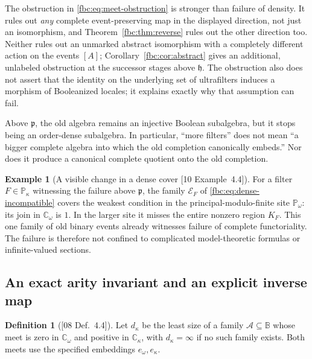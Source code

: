 \documentclass[11pt,letterpaper]{article}
\theoremstyle{definition}
\newtheorem{definition}[theorem]{Definition}
\newtheorem{example}[theorem]{Example}
\theoremstyle{remark}
\newcommand{\om}{\omega}
\newcommand{\B}{\mathbb B}
\newcommand{\C}{\mathbb C}
\newcommand{\PP}{\mathbb P}
\newcommand{\cp}{\mathfrak p}
\newcommand{\ch}{\mathfrak h}
\newcommand{\cE}{\mathcal E}
\newcommand{\src}[1]{\textup{[#1]}}
\begin{document}
The obstruction in \eqref{fbc:eq:meet-obstruction} is stronger than
failure of density. It rules out \emph{any} complete event-preserving
map in the displayed direction, not just an isomorphism, and
Theorem~\ref{fbc:thm:reverse} rules out the other direction too. Neither
rules out an unmarked abstract isomorphism with a completely different
action on the events $[A]$; Corollary~\ref{fbc:cor:abstract} gives an
additional, unlabeled obstruction at the successor stages above $\ch$.
The obstruction also does not assert that the identity on the underlying
set of ultrafilters induces a morphism of Booleanized locales; it
explains exactly why that assumption can fail.

Above $\cp$, the old algebra remains an injective Boolean subalgebra,
but it stops being an order-dense subalgebra. In particular, ``more
filters'' does not mean ``a bigger complete algebra into which the old
completion canonically embeds.'' Nor does it produce a canonical complete
quotient onto the old completion.

\begin{example}[A visible change in a dense cover \src{10 Example~4.4}]\label{fbc:ex:visible}
For a filter $F\in\PP_\kappa$ witnessing the failure above $\cp$, the
family $\cE_F$ of \eqref{fbc:eq:dense-incompatible} covers the weakest
condition in the principal-modulo-finite site $\PP_\om$: its join in
$\C_\om$ is $1$. In the larger site it misses the entire nonzero region
$K_F$. This one family of old binary events already witnesses failure of
complete functoriality. The failure is therefore not confined to
complicated model-theoretic formulas or infinite-valued sections.
\end{example}

\subsection{An exact arity invariant and an explicit inverse map}
\begin{definition}[\src{08 Def.~4.4}]\label{fbc:def:arity}
Let $d_\kappa$ be the least size of a family $\mathcal A\subseteq\B$
whose meet is zero in $\C_\om$ and positive in $\C_\kappa$, with
$d_\kappa=\infty$ if no such family exists. Both meets use the
specified embeddings $e_\om,e_\kappa$.
\end{definition}
\end{document}
